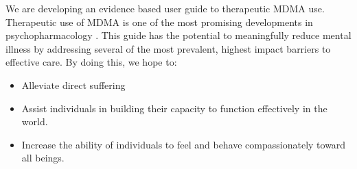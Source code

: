 \documentclass[12pt,letterpaper]{book}
\begin{document}
We are developing an evidence based user guide to therapeutic MDMA use. Therapeutic use of MDMA is one of the most promising developments in psychopharmacology \cite{mitchellMDMAClinicalTrial2}. This guide has the potential to meaningfully reduce mental illness by addressing several of the most prevalent, highest impact barriers to effective care. By doing this, we hope to:
\begin{itemize}
	\item Alleviate direct suffering
	\item Assist individuals in building their capacity to function effectively in the world.
	\item Increase the ability of individuals to feel and behave compassionately toward all beings.
\end{itemize}
\end{document}
